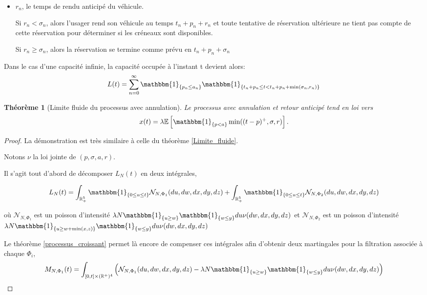 \documentclass[12pt,a4paper]{article}
\newcommand{\E}[1]{\mathbb{E}\left[ #1 \right]}
\newcommand{\R}{\mathbb{R}}
\newcommand{\1}[1]{\mathbbm{1}_{\{#1\}} }
\newtheorem{theorem}{Théorème}
\theoremstyle{definition}
\begin{document}
{\begin{itemize}
Si $a_n < p_n$, alors l'usager annule sa réservation au temps $t_n+a_n$ et toute tentative de réservation ultérieure  ne tient pas compte de cette réservation pour déterminer si les créneaux sont disponibles.

Si $a_n \geq p_n$, la réservation démarre comme prévu en $t_n + p_n$

\item $r_n$, le temps de rendu anticipé du véhicule.

Si $r_n < \sigma_n$, alors l'usager rend son véhicule au temps $t_n+p_n+r_n$ et toute tentative de réservation ultérieure  ne tient pas compte de cette réservation pour déterminer si les créneaux sont disponibles.

Si $r_n \geq \sigma_n$, alors la réservation se termine comme prévu en $t_n+p_n+\sigma_n$\\
\end{itemize} 

Dans le cas d'une capacité infinie, la capacité occupée à l'instant t devient alors:
$$L(t) = \sum_{n=0}^{\infty} \1{p_n\leq a_n}\mathbbm{1}_{\{t_n+p_n \leq t < t_n + p_n +\min(\sigma_n,r_n)\}}$$

\begin{theorem}[Limite fluide du processus avec annulation]
\label{Limite_fluide_anul}
Le processus avec annulation et retour anticipé tend en loi vers $$x(t) = \lambda\E{\1{p<a}\min((t-p)^+,\sigma,r)}.$$

\end{theorem}

\begin{proof}

La démonstration est très similaire à celle du théorème \ref{Limite_fluide}.


Notons $\nu$ la loi jointe de $(p,\sigma,a,r)$.

Il s'agit tout d'abord de décomposer $L_N(t)$ en deux intégrales,

$$L_N(t) = \int_{\R_+^5} \1{0\leq u \leq t} \mathcal{N}_{N,\Phi_1}(du,dw,dx,dy,dz) + \int_{\R_+^5} \1{0\leq u \leq t} \mathcal{N}_{N,\Phi_2}(du,dw,dx,dy,dz)$$

où $\mathcal{N}_{N,\Phi_1}$ est un poisson d'intensité $\lambda N \1{u\geq w}\1{w\leq y} du \nu(dw,dx,dy,dz)$ et  $\mathcal{N}_{N,\Phi_2}$ est un poisson d'intensité $\lambda N \1{u\geq w + \min(x,z)}\1{w\leq y} du \nu(dw,dx,dy,dz)$


Le théorème \ref{processus_croissant} permet là encore de compenser ces intégrales afin d'obtenir deux martingales pour la filtration associée à chaque $\Phi_i$,
$$M_{N,\Phi_1}(t) = \int_{[0,t]\times (\R^+)^4}  \left(\mathcal{N}_{N,\Phi_1}(du,dw,dx,dy,dz)-\lambda N \1{u\geq w}\1{w\leq y} du \nu(dw,dx,dy,dz)\right)$$


\end{proof}}
\end{document}
